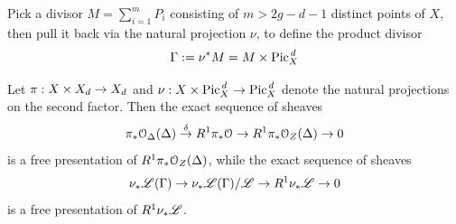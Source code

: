 		\begin{defi}\label{def:Gamma}
			Pick a divisor $M = \sum_{i=1}^m P_i$ consisting of $m > 2g-d-1$ distinct points of $X$, then pull it back via the natural projection $\nu$, to define the product divisor $$\Gamma := \nu^* M = M\times \operatorname{Pic}^{\,d}_X$$
		\end{defi}	


		\begin{prop}\label{prop:free_pres}
			Let $\pi : X\times X_d \to X_d$ and $\nu : X\times \operatorname{Pic}^{\,d}_X \to \operatorname{Pic}^{\,d}_X$ denote the natural projections on the second factor. Then the exact sequence of sheaves
			\begin{equation}\label{eq:univ_div_seq}
				\pi_* \mathcal{O}_{\Delta}(\Delta)\overset{\delta}\to R^1 \pi_* \mathcal{O} \to R^1 \pi_* \mathcal{O}_Z(\Delta) \to 0
			\end{equation}
			is a free presentation of $R^1 \pi_* \mathcal{O}_Z(\Delta)$, while the exact sequence of sheaves
			\begin{equation}\label{eq:univ_lb_seq}
				\nu_{*} \mathscr{L}(\Gamma)\to \nu_{*} \mathscr{L}(\Gamma) / \mathscr{L} \to R^1 \nu_{*} \mathscr{L} \to 0
			\end{equation}		
			is a free presentation of $R^1 \nu_{*} \mathscr{L}$.
		\end{prop}
